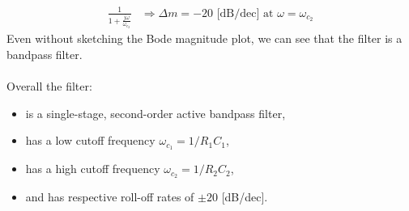 \documentclass{report}
\begin{document}
\begin{solution}
\begin{align*}
        \frac{1}{1+\frac{j\omega}{\omega_{c_2}}} &\Longrightarrow \Delta m = -20 \text{ [dB/dec] at } \omega = \omega_{c_2}
    \end{align*}
    Even without sketching the Bode magnitude plot, we can see that the filter is a bandpass filter. 
    \\ \\
    Overall the filter:
    \begin{itemize}
        \item is a single-stage, second-order active bandpass filter,
        \item has a low cutoff frequency $\omega_{c_1}=1/R_1C_1$,
        \item has a high cutoff frequency $\omega_{c_2}=1/R_2C_2$,
        \item and has respective roll-off rates of $\pm 20$ [dB/dec].
    \end{itemize}
\end{solution}
\end{document}
